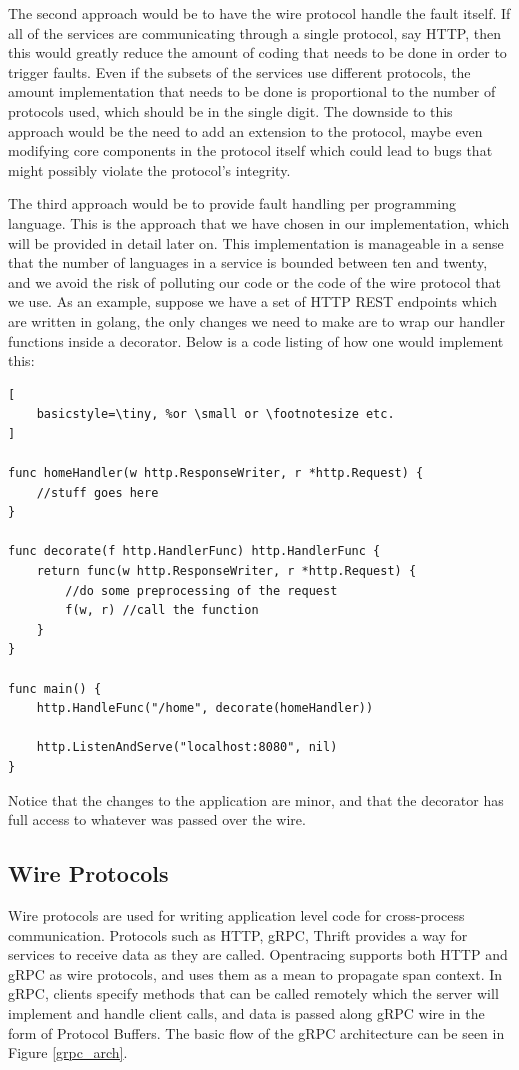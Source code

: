 The second approach would be to have the wire protocol handle the fault itself. If all of the services are communicating through a single protocol, say HTTP, then this would greatly reduce the amount of coding that needs to be done in order to trigger faults. Even if the subsets of the services use different protocols, the amount implementation that needs to be done is proportional to the number of protocols used, which should be in the single digit. The downside to this approach would be the need to add an extension to the protocol, maybe even modifying core components in the protocol itself which could lead to bugs that might possibly violate the protocol's integrity.

The third approach would be to provide fault handling per programming language. This is the approach that we have chosen in our implementation, which will be provided in detail later on. This implementation is manageable in a sense that the number of languages in a service is bounded between ten and twenty, and we avoid the risk of polluting our code or the code of the wire protocol that we use. As an example, suppose we have a set of HTTP REST endpoints which are written in golang\cite{google:golang}, the only changes we need to make are to wrap our handler functions inside a decorator. Below is a code listing of how one would implement this:


\begin{lstlisting}[
    basicstyle=\tiny, %or \small or \footnotesize etc.
]

func homeHandler(w http.ResponseWriter, r *http.Request) {
    //stuff goes here
}

func decorate(f http.HandlerFunc) http.HandlerFunc {
    return func(w http.ResponseWriter, r *http.Request) {
        //do some preprocessing of the request
        f(w, r) //call the function
    }
}

func main() {
    http.HandleFunc("/home", decorate(homeHandler))

    http.ListenAndServe("localhost:8080", nil)
}
\end{lstlisting}

Notice that the changes to the application are minor, and that the decorator has full access to whatever was passed over the wire.



\subsection{Wire Protocols}
Wire protocols are used for writing application level code for cross-process communication. 
Protocols such as HTTP, gRPC\cite{google:grpc}, Thrift\cite{apache:thrift} provides a way for
services to receive data as they are called. Opentracing supports both HTTP and gRPC as wire protocols,
and uses them as a mean to propagate span context. In gRPC, clients specify methods that can be called 
remotely which the server will implement and handle client calls, and data is passed along gRPC wire in the 
form of Protocol Buffers\cite{google:protobuf}. The basic flow of the gRPC architecture\cite{google:grpc} can be seen in Figure \ref{grpc_arch}.



